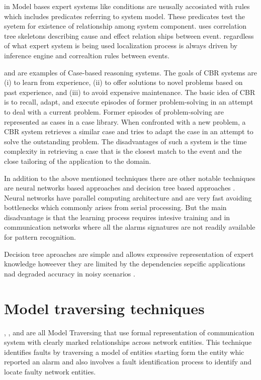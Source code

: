 \documentclass[10pt]{sigplan-proc-varsize}
\begin{document}
in Model bases expert systems like \cite{Nygate:95} conditions are ususally accosiated with rules which includes predicates referring to system model. 
These predicates test the syetem for existence of relationship among system component. \cite{Nygate:95} 
uses correlation tree skeletons describing cause and effect relation ships between event. regardless of what expert system is being used localization process is 
always driven by inference engine and correaltion rules between events. 

\cite{Lewis:93} and \cite{Gardner:96} are examples of Case-based reasoning systems. The goals of CBR systems are (i) to learn from experience, (ii) to 
offer solutions to novel problems based on past experience, and (iii) to avoid expensive maintenance. The basic idea of CBR is to recall, adapt, and 
execute episodes of former problem-solving in an attempt to deal with a current problem. Former episodes of problem-solving are represented as cases in a case 
library. When confronted with a new problem, a CBR system retrieves a similar case and tries to adapt the case in an attempt to solve the outstanding problem. 
The disadvantages of such a system is the time complexity in retrieving a case that is the closest match to the event and the close tailoring of the application 
to the domain.

In addition to the above mentioned techniques there are other notable techniques are neural networks based approaches \cite{Gardner:97} \cite{Gardner:98} and 
decision tree based approaches \cite{Rodosek:98}. Neural networks have parallel computing architecture and are very fast avoiding bottlenecks which 
commonly arises from serial processing. But the main disadvantage is that the learning process requires intesive training  and in communication networks 
where all the alarms signatures are not readily available for pattern recognition.

Decision tree aproaches are simple and allows expressive representation of expert knowledge howeever they are limited by the dependencies sepcific 
applications nad degraded accuracy in noisy scenarios \cite{Russell:96} \cite{Koller:10}.

\section{Model traversing techniques}
\cite{Katker:96}, \cite{Katker:971}, \cite{Katker:97} and \cite{Gruschke:98} are all Model Traversing that use formal representation of communication 
system with clearly marked relationships across network entities. This technique identifies faults by traversing a model of entities starting form the entity whic reported an alarm and also involves a fault identification process to identify and locate faulty network entities.
\end{document}
